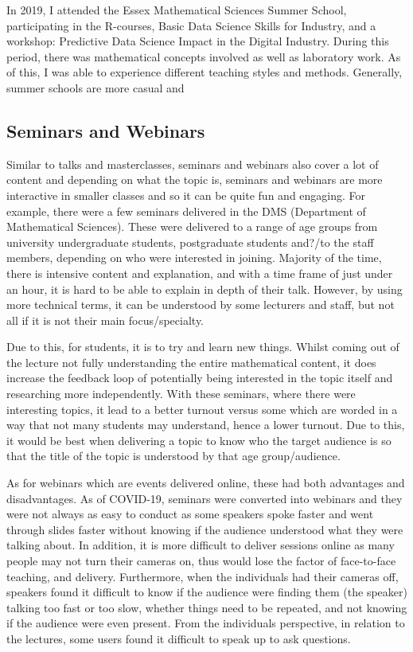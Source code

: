 \documentclass[12pt, a4paper,oneside]{book}
\numberwithin{equation}{section}
\begin{document}
In 2019, I attended the Essex Mathematical Sciences Summer School, participating in the R-courses, Basic Data Science Skills for Industry, and a workshop: Predictive Data Science Impact in the Digital Industry. During this period, there was mathematical concepts involved as well as laboratory work. As of this, I was able to experience different teaching styles and methods. Generally, summer schools are more casual and

\subsection{Seminars and Webinars}
Similar to talks and masterclasses, seminars and webinars also cover {\color{red}a lot} of content and depending on what the topic is, seminars and webinars are more interactive in smaller classes and so it can be quite fun and engaging. For example, there were a few seminars delivered in the DMS (Department of Mathematical Sciences). These were delivered to a range of age groups from university undergraduate students, postgraduate students and?/to the staff members, depending on who were interested in joining. Majority of the time, there is intensive content and explanation, and with a time frame of just under an hour, it is hard to be able to explain in depth of their talk.
However, by using more technical terms, it can be understood by some lecturers and staff, but not all if it is not their main focus/specialty.

Due to this, for students, it is to try and learn new things. Whilst coming out of the lecture not fully understanding the entire mathematical content, it does increase the feedback loop of potentially being interested in the topic itself and researching more independently. With these seminars, where there were interesting topics, it lead to a better turnout versus some which are worded in a way that not many students may understand, hence a lower turnout. Due to this, it would be best when delivering a topic to know who the target audience is so that the title of the topic is understood by that age group/audience.

As for webinars which are events delivered online, these had both advantages and disadvantages. As of COVID-19, seminars were converted into webinars and they were not always as easy to conduct as some speakers spoke faster and went through slides faster without knowing if the audience understood what they were talking about. In addition, it is more difficult to deliver sessions online as many people may not turn their cameras on, thus would lose the factor of face-to-face teaching, and delivery. Furthermore, when the individuals had their cameras off, speakers found it difficult to know if the audience were finding them (the speaker) talking too fast or too slow, whether things need to be repeated, and not knowing if the audience were even present. From the individuals perspective, in relation to the lectures, some users found it difficult to speak up to ask questions.
\end{document}
